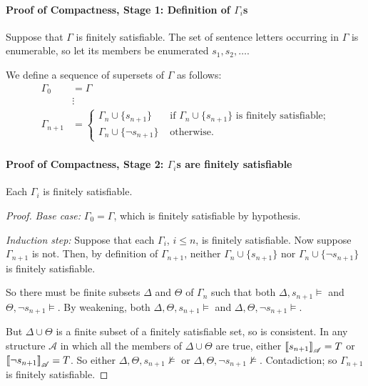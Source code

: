 \paragraph{Proof of Compactness, Stage 1: Definition of $\Gamma_{i}$s}

Suppose that $\Gamma$ is finitely satisfiable. The set of sentence letters occurring in $\Gamma$ is enumerable, so let its members be enumerated $s_{1},s_{2},\ldots$.

We define a sequence of supersets of $\Gamma$ as follows:
 \begin{align*}
		\Gamma_{0} &= \Gamma\\
	&\vdots \\
	\Gamma_{n+1} &= \begin{cases}
		\Gamma_{n}\cup\{s_{n+1}\} &\text{ if } \Gamma_{n} \cup \{s_{n+1}\} \text{ is finitely satisfiable;}\\
		\Gamma_{n}\cup\{\neg s_{n+1}\} &\text{ otherwise.}
	\end{cases}
\end{align*}



\paragraph{Proof of Compactness, Stage 2:  $\Gamma_{i}$s are finitely satisfiable}

\begin{lemma}
Each $\Gamma_{i}$ is finitely satisfiable.
\begin{proof}
{\emph{Base case:} $\Gamma_{0}=\Gamma$, which is finitely satisfiable by hypothesis.
	
	\emph{Induction step:} Suppose that each $\Gamma_{i}$, $i\leqslant n$, is finitely satisfiable. Now suppose $\Gamma_{n+1}$ is not. Then, by definition of $\Gamma_{n+1}$, neither $\Gamma_{n}\cup\{s_{n+1}\}$ nor $\Gamma_{n}\cup\{\neg s_{n+1}\}$ is finitely satisfiable.
	
	So there must be finite subsets $\Delta$ and $\Theta$ of $\Gamma_{n}$ such that both $\Delta, s_{n+1}\vDash$ and $\Theta,\neg s_{n+1}\vDash$. By weakening, both $\Delta,\Theta, s_{n+1}\vDash$ and $\Delta,\Theta,\neg s_{n+1}\vDash$. 
	
	But $\Delta\cup\Theta$ is a finite subset of a finitely satisfiable set, so is consistent. In any structure $\mathscr{A}$ in which all the members of $\Delta\cup\Theta$ are true, either $\left\llbracket s_{n+1}\right\rrbracket_{\mathscr{A}}=T$ or $\left\llbracket \neg s_{n+1}\right\rrbracket_{\mathscr{A}}=T$. So  either $\Delta,\Theta,s_{n+1}\not\vDash$ or $\Delta,\Theta,\neg s_{n+1}\not\vDash$. Contadiction; so $\Gamma_{n+1}$ is finitely satisfiable. 
}\end{proof}
\end{lemma}

